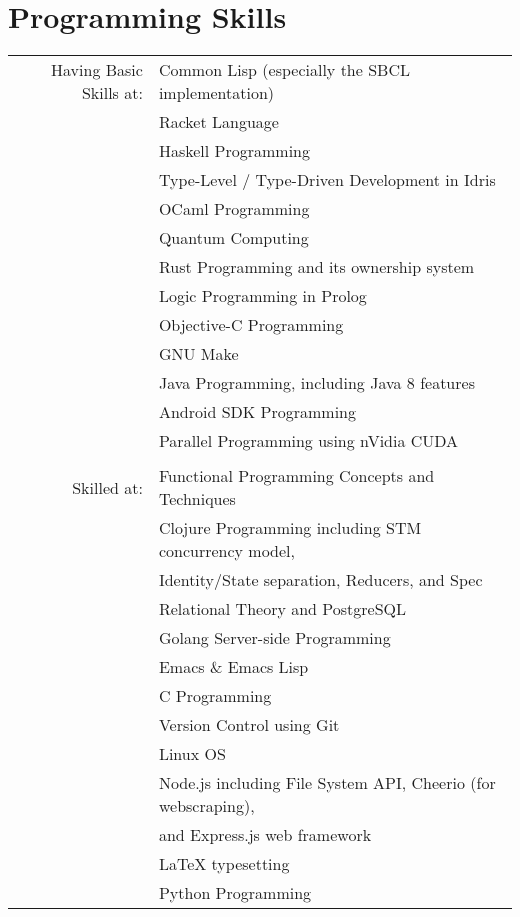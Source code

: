 \documentclass[a4paper,10pt]{article}
\begin{document}
\section{Programming Skills}
\begin{tabular}{rl}
Having Basic Skills at:
					& Common Lisp (especially the SBCL implementation)\\
					& Racket Language\\
					& Haskell Programming\\
					& Type-Level / Type-Driven Development in Idris\\
					& OCaml Programming\\
					& Quantum Computing\\
					& Rust Programming and its ownership system\\
					& Logic Programming in Prolog\\
					& Objective-C Programming\\
					& GNU Make\\
					& Java Programming, including Java 8 features\\
					& Android SDK Programming\\
	                & Parallel Programming using nVidia CUDA\\
					\\
Skilled at:
				& Functional Programming Concepts and Techniques\\
				& Clojure Programming including STM concurrency model,\\
				& \hspace{1cm} Identity/State separation, Reducers, and Spec\\
				& Relational Theory and PostgreSQL\\
				& Golang Server-side Programming\\
				& Emacs \& Emacs Lisp\\
				& C Programming\\
				& Version Control using Git\\
				& Linux OS\\
				& Node.js including File System API, Cheerio (for webscraping),\\
				& \hspace{1cm} and Express.js web framework\\
				& {\fb \LaTeX} typesetting\\%
				& Python Programming\\

\end{tabular}
\end{document}
